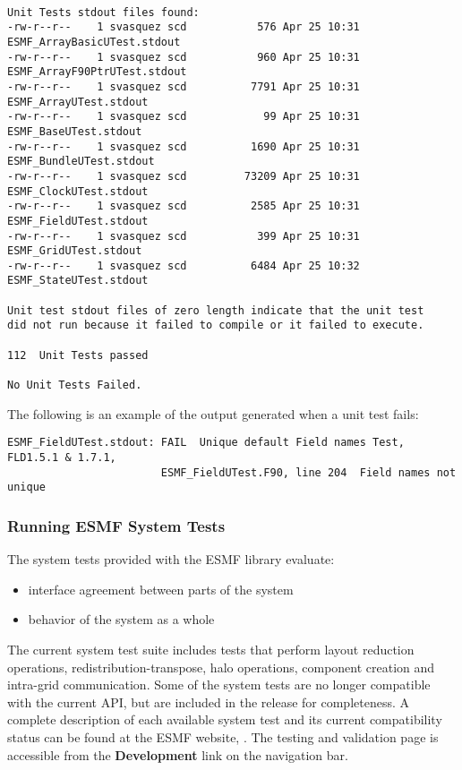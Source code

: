 \begin{verbatim}

Unit Tests stdout files found: 
-rw-r--r--    1 svasquez scd           576 Apr 25 10:31 ESMF_ArrayBasicUTest.stdout
-rw-r--r--    1 svasquez scd           960 Apr 25 10:31 ESMF_ArrayF90PtrUTest.stdout
-rw-r--r--    1 svasquez scd          7791 Apr 25 10:31 ESMF_ArrayUTest.stdout
-rw-r--r--    1 svasquez scd            99 Apr 25 10:31 ESMF_BaseUTest.stdout
-rw-r--r--    1 svasquez scd          1690 Apr 25 10:31 ESMF_BundleUTest.stdout
-rw-r--r--    1 svasquez scd         73209 Apr 25 10:31 ESMF_ClockUTest.stdout
-rw-r--r--    1 svasquez scd          2585 Apr 25 10:31 ESMF_FieldUTest.stdout
-rw-r--r--    1 svasquez scd           399 Apr 25 10:31 ESMF_GridUTest.stdout
-rw-r--r--    1 svasquez scd          6484 Apr 25 10:32 ESMF_StateUTest.stdout

Unit test stdout files of zero length indicate that the unit test
did not run because it failed to compile or it failed to execute. 

112  Unit Tests passed 

No Unit Tests Failed.

\end{verbatim}

The following is an example of the output generated when a unit test fails:
\begin{verbatim}
ESMF_FieldUTest.stdout: FAIL  Unique default Field names Test, FLD1.5.1 & 1.7.1,
                        ESMF_FieldUTest.F90, line 204  Field names not unique
\end{verbatim}

\subsubsection{Running ESMF System Tests}
\label{SystemTestDescription}

The system tests provided with the ESMF library evaluate:
\begin{itemize}
\item interface agreement between parts of the system
\item behavior of the system as a whole
\end{itemize}

The current system test suite includes tests that perform layout
reduction operations, redistribution-transpose, halo operations,
component creation and intra-grid communication.  Some of the system
tests are no longer compatible with the current API, but are included
in the release for completeness.  A complete description of each
available system test and its current compatibility status can be
found at the ESMF website,
.  
The testing
and validation page is accessible from the {\bf Development} 
link on the navigation bar.

